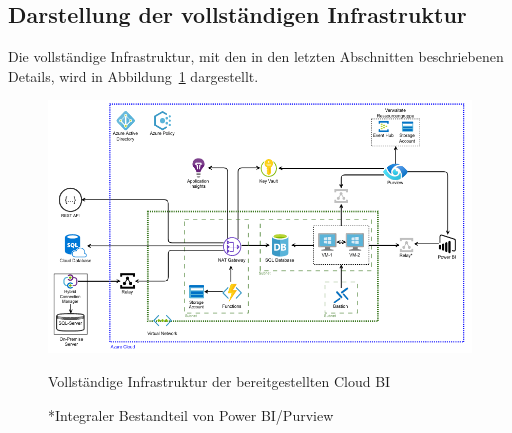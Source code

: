 \subsection{Darstellung der vollständigen Infrastruktur} \label{subsec:infra:konfig:VollständigeInfrastruktur}
Die vollständige Infrastruktur, mit den in den letzten Abschnitten beschriebenen Details, wird in Abbildung~\ref{fig:chap04_VollständigeInfrastruktur} dargestellt.

 \begin{figure}[htbp]
 \centering
 \includegraphics[width=\textwidth]{gfx/azure/infra.pdf}
 \caption[Vollständige Infrastruktur der Cloud BI]{Vollständige Infrastruktur der bereitgestellten Cloud BI}
 \caption*{\scriptsize{*Integraler Bestandteil von Power BI/Purview}}
\label{fig:chap04_VollständigeInfrastruktur}
\end{figure}